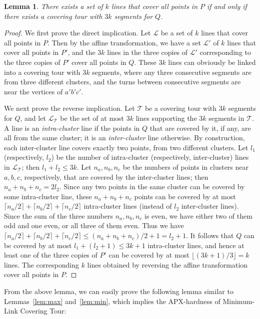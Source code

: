 \documentclass[letterpaper,11pt]{article}
\newtheorem{lemma}{Lemma}
\def\L{{\mathcal L}}
\def\T{{\mathcal T}}
\begin{document}
\begin{lemma}
There exists a set of $k$ lines that cover all points in $P$
if and only if
there exists a covering tour with $3k$ segments for $Q$.
\end{lemma}
\begin{proof}
We first prove the direct implication.
Let $\L$ be a set of $k$ lines that cover all points in $P$.
Then by the affine transformation,
we have a set $\L'$ of $k$ lines that cover all points in $P'$,
and the $3k$ lines in the three copies of $\L'$
corresponding to the three copies of $P'$ cover all points in $Q$.
These $3k$ lines can obviously be linked into a covering tour
with $3k$ segments,
where any three consecutive segments are from three different clusters,
and the turns between consecutive segments are near the vertices of $a'b'c'$.

We next prove the reverse implication.
Let $\T$ be a covering tour with $3k$ segments for $Q$,
and let $\L_\T$ be the set of at most $3k$ lines
supporting the $3k$ segments in $\T$.
A line is an \emph{intra-cluster} line if the points in $Q$ that are covered
by it, if any, are all from the same cluster;
it is an \emph{inter-cluster} line otherwise.
By construction,
each inter-cluster line covers exactly two points, from two different clusters.
Let $l_1$ (respectively, $l_2$) be the number of
intra-cluster (respectively, inter-cluster) lines in $\L_\T$;
then $l_1 + l_2 \le 3k$.
Let $n_a,n_b,n_c$ be the numbers of points in clusters near $a,b,c$,
respectively, that are covered by the inter-cluster lines;
then $n_a + n_b + n_c = 2 l_2$.
Since any two points in the same cluster can be covered by some intra-cluster
line, these $n_a + n_b + n_c$ points can be covered by at most
$\lceil n_a/2 \rceil + \lceil n_b/2 \rceil + \lceil n_c/2 \rceil$
intra-cluster lines (instead of $l_2$ inter-cluster lines).
Since the sum of the three numbers $n_a,n_b,n_c$ is even,
we have either two of them odd and one even, or all three of them even.
Thus we have
$\lceil n_a/2 \rceil + \lceil n_b/2 \rceil + \lceil n_c/2 \rceil
\le (n_a + n_b + n_c) /2 + 1 = l_2 + 1$.
It follows that $Q$ can be covered by at most $l_1 + (l_2 + 1) \le 3k + 1$
intra-cluster lines, and hence at least one of the three copies of $P'$
can be covered by at most $\lfloor (3k+1)/3 \rfloor = k$ lines.
The corresponding $k$ lines obtained by reversing the affine transformation
cover all points in $P$.
\end{proof}

From the above lemma, we can easily prove the following lemma similar to
Lemmas~\ref{lem:max} and~\ref{lem:min},
which implies the APX-hardness of {\sc Minimum-Link Covering Tour}:
\end{document}
